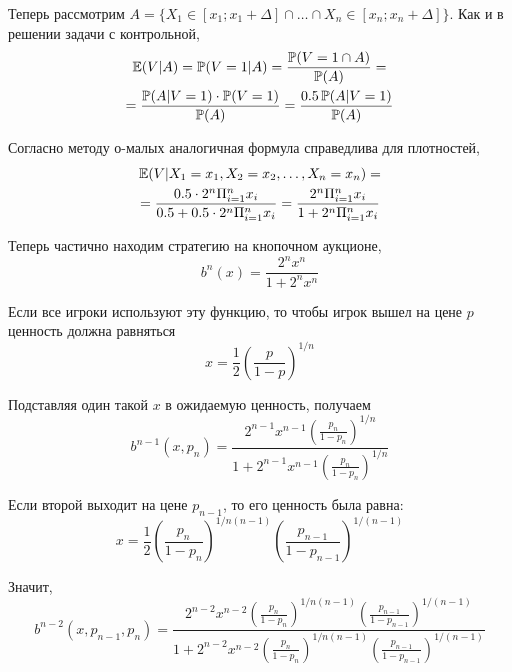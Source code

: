 \begin{enumerate}
Теперь рассмотрим $ A=\{X_{1}\in[x_{1};x_{1}+\Delta] \cap \ldots  \cap X_{n}\in[x_{n};x_{n}+\Delta]\} $. Как и в решении задачи с контрольной,
\begin{multline}
\operatorname{\mathbb{E}}(V|A)=\operatorname{\mathbb{P}}(V=1|A)=\frac{\operatorname{\mathbb{P}}(V=1 \cap A)}{\operatorname{\mathbb{P}}(A)}=\\
=\frac{\operatorname{\mathbb{P}}(A|V=1)\cdot \operatorname{\mathbb{P}}(V=1)}{\operatorname{\mathbb{P}}(A)}=\frac{0.5\operatorname{\mathbb{P}}(A|V=1)}{\operatorname{\mathbb{P}}(A)}
\end{multline}

Согласно методу о-малых аналогичная формула справедлива для плотностей,
\begin{multline}
\operatorname{\mathbb{E}}(V|X_{1}=x_{1},X_{2}=x_{2},\ldots ,X_{n}=x_{n})=\\
=\frac{0.5\cdot 2^{n}\Pi_{i=1}^{n}x_{i}}{0.5+0.5\cdot 2^{n}\Pi_{i=1}^{n}x_{i}}
=\frac{2^{n}\Pi_{i=1}^{n}x_{i}}{1+ 2^{n}\Pi_{i=1}^{n}x_{i}}
\end{multline}

Теперь частично находим стратегию на кнопочном аукционе,
\begin{equation}
b^{n}(x)=\frac{2^{n}x^{n}}{1+2^{n}x^{n}}
\end{equation}

Если все игроки используют эту функцию, то чтобы игрок вышел на цене $ p $ ценность должна равняться
\begin{equation}
x=\frac{1}{2}\left(\frac{p}{1-p} \right)^{1/n}
\end{equation}

Подставляя один такой $ x $ в ожидаемую ценность, получаем
\begin{equation}
b^{n-1}(x,p_{n})=\frac{2^{n-1}x^{n-1}\left(\frac{p_{n}}{1-p_{n}} \right)^{1/n}}{1+2^{n-1}x^{n-1}\left(\frac{p_{n}}{1-p_{n}} \right)^{1/n}}
\end{equation}

Если второй выходит на цене $ p_{n-1} $, то его ценность была равна:
\begin{equation}
x=\frac{1}{2}\left(\frac{p_{n}}{1-p_{n}} \right)^{1/n(n-1)}\left(\frac{p_{n-1}}{1-p_{n-1}} \right)^{1/(n-1)}
\end{equation}

Значит,
\begin{equation}
b^{n-2}(x,p_{n-1},p_{n})=\frac{2^{n-2}x^{n-2}\left(\frac{p_{n}}{1-p_{n}} \right)^{1/n(n-1)}\left(\frac{p_{n-1}}{1-p_{n-1}} \right)^{1/(n-1)}}{1+2^{n-2}x^{n-2}\left(\frac{p_{n}}{1-p_{n}} \right)^{1/n(n-1)}\left(\frac{p_{n-1}}{1-p_{n-1}} \right)^{1/(n-1)}}
\end{equation}



\end{enumerate}
